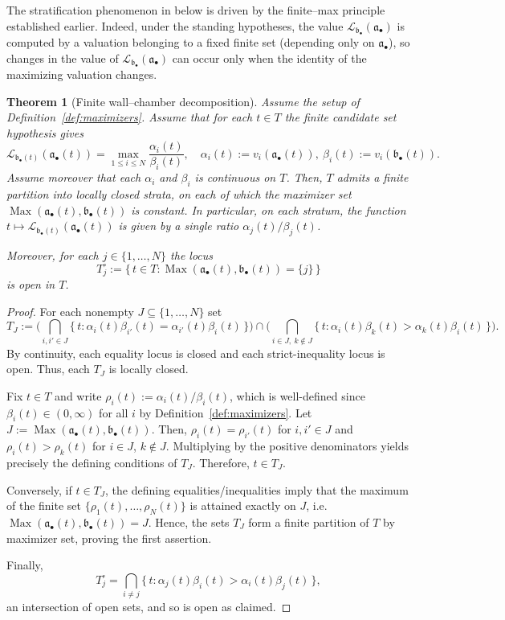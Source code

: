 \documentclass[12pt]{amsart}
\renewcommand{\a}{\mathfrak{a}}
\renewcommand{\b}{\mathfrak{b}}
\newcommand{\Loj}{\mathcal{L}} %
\DeclareMathOperator{\Max}{Max}
\newcommand{\abul}{{\a_\bullet}}
\newcommand{\bbul}{{\b_\bullet}}
\theoremstyle{plain}
\newtheorem{theorem}{Theorem}[section]
\theoremstyle{definition}
\numberwithin{equation}{section}
\begin{document}
	The stratification phenomenon in  below is driven by the
	finite--max principle established earlier.
	Indeed, under the standing hypotheses, the value
	$\Loj_{\bbul}(\abul)$ is computed by a valuation belonging to a fixed finite set
	(depending only on $\abul$), so changes in the value of $\Loj_{\bbul}(\abul)$ can occur
	only when the identity of the maximizing valuation changes.


\begin{theorem}[Finite wall--chamber decomposition]\label{thm:stratification}
	Assume the setup of Definition~\ref{def:maximizers}. Assume that for each $t\in T$ the finite candidate set
	hypothesis gives
	\[
	\Loj_{\bbul(t)}(\abul(t))=\max_{1\le i\le N}\frac{\alpha_i(t)}{\beta_i(t)},
	\quad
	\alpha_i(t):=v_i(\abul(t)),\ \beta_i(t):=v_i(\bbul(t)).
	\]
	Assume moreover that each $\alpha_i$ and $\beta_i$ is continuous on $T$.
	Then, $T$ admits a finite partition into locally closed strata, on each of which the maximizer set
	$\Max(\abul(t),\bbul(t))$ is constant. In particular, on each stratum, the function
	$t\mapsto \Loj_{\bbul(t)}(\abul(t))$ is given by a single ratio $\alpha_j(t)/\beta_j(t)$.
	
	Moreover, for each $j\in\{1,\dots,N\}$ the locus
	\[
	T_j^\circ:=\{\,t\in T:\Max(\abul(t),\bbul(t))=\{j\}\,\}
	\]
	is open in $T$.
\end{theorem}

\begin{proof}
	For each nonempty $J\subseteq\{1,\dots,N\}$ set
	\[
	T_J
	:=
	\Big(\bigcap_{i,i'\in J}\{\,t:\alpha_i(t)\beta_{i'}(t)=\alpha_{i'}(t)\beta_i(t)\,\}\Big)
	\cap
	\Big(\bigcap_{i\in J,\ k\notin J}\{\,t:\alpha_i(t)\beta_k(t)>\alpha_k(t)\beta_i(t)\,\}\Big).
	\]
	By continuity, each equality locus is closed and each strict-inequality locus is open. Thus, each $T_J$
	is locally closed.
	
	Fix $t\in T$ and write $\rho_i(t):=\alpha_i(t)/\beta_i(t)$, which is well-defined since
	$\beta_i(t)\in(0,\infty)$ for all $i$ by Definition~\ref{def:maximizers}. Let $J:=\Max(\abul(t),\bbul(t))$.
	Then, $\rho_i(t)=\rho_{i'}(t)$ for $i,i'\in J$ and $\rho_i(t)>\rho_k(t)$ for $i\in J$, $k\notin J$.
	Multiplying by the positive denominators yields precisely the defining conditions of $T_J$. Therefore, $t\in T_J$.
	
	Conversely, if $t\in T_J$, the defining equalities/inequalities imply that the maximum of the finite set
	$\{\rho_1(t),\dots,\rho_N(t)\}$ is attained exactly on $J$, i.e. $\Max(\abul(t),\bbul(t))=J$.
	Hence, the sets $T_J$ form a finite partition of $T$ by maximizer set, proving the first assertion.
	
	Finally,
	\[
	T_j^\circ=\bigcap_{i\neq j}\{\,t:\alpha_j(t)\beta_i(t)>\alpha_i(t)\beta_j(t)\,\},
	\]
	an intersection of open sets, and so is open as claimed.
\end{proof}
\end{document}
